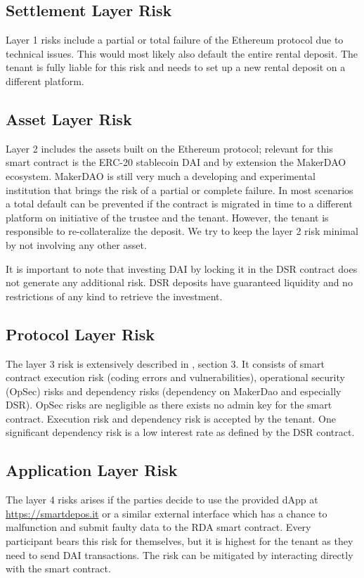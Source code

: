 \documentclass[12pt,a4paper,titlepage,oneside,english]{article}
\begin{document}
\subsection{Settlement Layer Risk}
Layer 1 risks include a partial or total failure of the Ethereum protocol due to technical issues. This would most likely also default the entire rental deposit. The tenant is fully liable for this risk and needs to set up a new rental deposit on a different platform.

\subsection{Asset Layer Risk}
Layer 2 includes the assets built on the Ethereum protocol; relevant for this smart contract is the ERC-20 stablecoin DAI and by extension the MakerDAO ecosystem. MakerDAO is still very much a developing and experimental institution that brings the risk of a partial or complete failure. In most scenarios a total default can be prevented if the contract is migrated in time to a different platform on initiative of the trustee and the tenant. However, the tenant is responsible to re-collateralize the deposit. We try to keep the layer 2 risk minimal by not involving any other asset.

It is important to note that investing DAI by locking it in the DSR contract does not generate any additional risk. DSR deposits have guaranteed liquidity and no restrictions of any kind to retrieve the investment.

\subsection{Protocol Layer Risk}
The layer 3 risk is extensively described in \cite{Schaer2020}, section 3. It consists of smart contract execution risk (coding errors and vulnerabilities), operational security (OpSec) risks and dependency risks (dependency on MakerDao and especially DSR). 
OpSec risks are negligible as there exists no admin key for the smart contract. Execution risk and dependency risk is accepted by the tenant. One significant dependency risk is a low interest rate as defined by the DSR contract.

\subsection{Application Layer Risk}
The layer 4 risks arises if the parties decide to use the provided dApp at \url{https://smartdepos.it} or a similar external interface which has a chance to malfunction and submit faulty data to the RDA smart contract. Every participant bears this risk for themselves, but it is highest for the tenant as they need to send DAI transactions. The risk can be mitigated by interacting directly with the smart contract.
\end{document}
